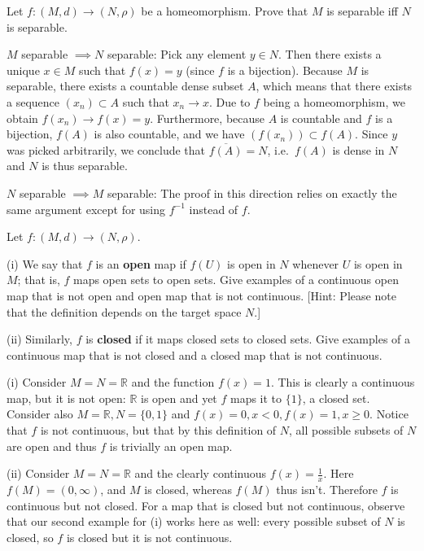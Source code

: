 \begin{exercise}{55}
    Let $f: (M, d) \rightarrow (N, \rho)$  be a homeomorphism.
    Prove that $M$ is separable iff $N$ is separable.
\end{exercise}

\begin{solution}
    
    $M$ separable $\implies N$ separable: Pick any element $y \in N$.
    Then there exists a unique $x \in M$ such that $f(x) = y$ (since $f$ is a bijection).
    Because $M$ is separable, there exists a countable dense subset $A$, which means that there exists a sequence $(x_n) \subset A$ such that $x_n \rightarrow x$.
    Due to $f$ being a homeomorphism, we obtain $f(x_n) \rightarrow f(x) = y$.
    Furthermore, because $A$ is countable and $f$ is a bijection, $f(A)$ is also countable, and we have $(f(x_n)) \subset f(A)$.
    Since $y$ was picked arbitrarily, we conclude that $\overline{f(A)} = N$,  i.e.\ $f(A)$ is dense in $N$ and $N$ is thus separable.

    $N$ separable $\implies M$ separable: The proof in this direction relies on exactly the same argument except for using $f^{-1}$ instead of $f$.
\end{solution}

\begin{exercise}{56}
    Let $f: (M, d) \rightarrow (N, \rho)$.

    (i) We say that $f$ is an \textbf{open} map if $f(U)$ is open in $N$ whenever $U$ is open in $M$; that is, $f$ maps open sets to open sets.
    Give examples of a continuous open map that is not open and open map that is not continuous.
    [Hint: Please note that the definition depends on the target space $N$.]

    (ii) Similarly, $f$ is \textbf{closed} if it maps closed sets to closed sets.
    Give examples of a continuous map that is not closed and a closed map that is not continuous.
\end{exercise}

\begin{solution}
    
    (i) Consider $M = N = \mathbb{R}$ and the function $f(x) = 1$.
    This is clearly a continuous map, but it is not open: $\mathbb{R}$ is open and yet $f$ maps it to $\{1\}$, a closed set.
    Consider also $M = \mathbb{R}, N = \{0, 1\}$ and $f(x) = 0, x < 0, f(x) = 1, x \geq 0$.
    Notice that $f$ is not continuous, but that by this definition of $N$, all possible subsets of $N$ are open and thus $f$ is trivially an open map.

    (ii) Consider $M = N = \mathbb{R}$ and the clearly continuous $f(x) = \frac{1}{x}$.
    Here $f(M) = (0, \infty)$, and $M$ is closed, whereas $f(M)$ thus isn't.
    Therefore $f$ is continuous but not closed.
    For a map that is closed but not continuous, observe that our second example for (i) works here as well: every possible subset of $N$ is closed, so $f$ is closed but it is not continuous.

\end{solution}

